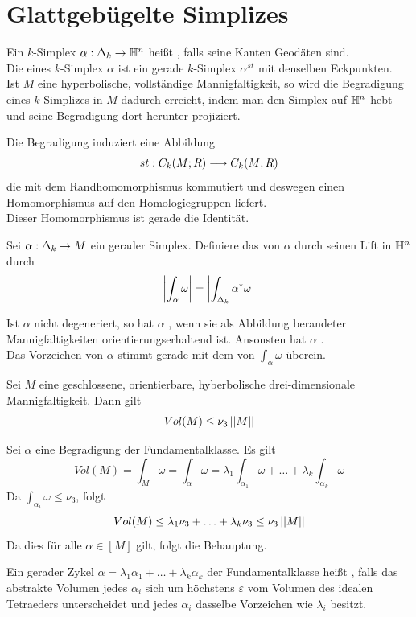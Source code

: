 \documentclass{book}
\renewcommand{\epsilon}{\varepsilon}
\begin{document}
\section{Glattgebügelte Simplizes}
\Def{}
Ein $k$-Simplex $\alpha : \Delta_k \overset{}{\rightarrow} \mathbb{H}^n$ heißt , falls seine Kanten Geodäten sind.\\
Die  eines $k$-Simplex $\alpha$ ist ein gerade $k$-Simplex $\alpha^{st}$ mit denselben Eckpunkten.\\
Ist $M$ eine hyperbolische, vollständige Mannigfaltigkeit, so wird die Begradigung eines $k$-Simplizes in $M$ dadurch erreicht, indem man den Simplex auf $\mathbb{H}^n$ hebt und seine Begradigung dort herunter projiziert.

\Lem{}
Die Begradigung induziert eine Abbildung
\[ st : C_k(M;R) \overset{}{\longrightarrow} C_k(M;R) \]
die mit dem Randhomomorphismus kommutiert und deswegen einen Homomorphismus auf den Homologiegruppen liefert.\\
Dieser Homomorphismus ist gerade die Identität.

\Def{}
Sei $\alpha : \Delta_k \overset{}{\rightarrow} M$ ein gerader Simplex. Definiere das  von $\alpha$ durch seinen Lift in $\mathbb{H}^n$ durch
\[ \left|\int_{\alpha} \omega\right| =\left|\int_{\Delta_k} \alpha^*\omega  \right| \]

\Def{}
Ist $\alpha$ nicht degeneriert, so hat $\alpha$ , wenn sie als Abbildung berandeter Mannigfaltigkeiten orientierungserhaltend ist. Ansonsten hat $\alpha$ .\\
Das Vorzeichen von $\alpha$ stimmt gerade mit dem von $\int_{\alpha} \omega$ überein.

\Prop{}
Sei $M$ eine geschlossene, orientierbare, hyberbolische drei-dimensionale Mannigfaltigkeit. Dann gilt
\[ Vol({M}) \leq \nu_3 \left|\left|M\right|\right| \]
\begin{Beweis}{}
	Sei $\alpha$ eine Begradigung der Fundamentalklasse. Es gilt
	\[ Vol(M) = \int_M \omega = \int_{\alpha} \omega = \lambda_1 \int_{\alpha_1} \omega + \ldots +\lambda_k \int_{\alpha_k} \omega \]
	Da $\int_{\alpha_i} \omega\leq \nu_3$, folgt
	\[ Vol(M) \leq \lambda_1 \nu_3 +\ldots + \lambda_k \nu_3 \leq \nu_3 \left|\left|M\right|\right| \]
	Da dies für alle $\alpha \in [M]$ gilt, folgt die Behauptung.
\end{Beweis}

\Def{}
Ein gerader {Zykel} $\alpha = \lambda_1 \alpha_1 + \ldots + \lambda_k \alpha_k$ der Fundamentalklasse heißt \df{$\epsilon$-effizient}, falls das abstrakte Volumen jedes $\alpha_i$ sich um höchstens $\epsilon$ vom Volumen des idealen Tetraeders unterscheidet und jedes $\alpha_i$ dasselbe Vorzeichen wie $\lambda_i$ besitzt.
\end{document}

